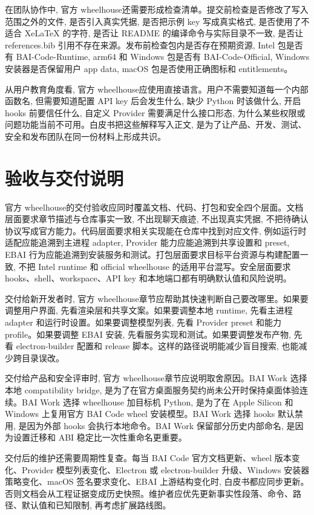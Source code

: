 在团队协作中, 官方 wheelhouse还需要形成检查清单。提交前检查是否修改了写入范围之外的文件, 是否引入真实凭据, 是否把示例 key 写成真实格式, 是否使用了不适合 XeLaTeX 的字符, 是否让 README 的编译命令与实际目录不一致, 是否让 references.bib 引用不存在来源。发布前检查包内是否存在预期资源, Intel 包是否有 BAI-Code-Runtime, arm64 和 Windows 包是否有 BAI-Code-Official, Windows 安装器是否保留用户 app data, macOS 包是否使用正确图标和 entitlements。

从用户教育角度看, 官方 wheelhouse应使用直接语言。用户不需要知道每一个内部函数名, 但需要知道配置 API key 后会发生什么, 缺少 Python 时该做什么, 开启 hooks 前要信任什么, 自定义 Provider 需要满足什么接口形态, 为什么某些权限或问题功能当前不可用。白皮书把这些解释写入正文, 是为了让产品、开发、测试、安全和发布团队在同一份材料上形成共识。

\section{验收与交付说明}
官方 wheelhouse的交付验收应同时覆盖文档、代码、打包和安全四个层面。文档层面要求章节描述与仓库事实一致, 不出现聊天痕迹, 不出现真实凭据, 不把待确认协议写成官方能力。代码层面要求相关实现能在仓库中找到对应文件, 例如运行时适配应能追溯到主进程 adapter, Provider 能力应能追溯到共享设置和 preset, EBAI 行为应能追溯到安装服务和测试。打包层面要求目标平台资源与构建配置一致, 不把 Intel runtime 和 official wheelhouse 的适用平台混写。安全层面要求 hooks、shell、workspace、API key 和本地端口都有明确默认值和风险说明。

交付给新开发者时, 官方 wheelhouse章节应帮助其快速判断自己要改哪里。如果要调整用户界面, 先看渲染层和共享文案。如果要调整本地 runtime, 先看主进程 adapter 和运行时设置。如果要调整模型列表, 先看 Provider preset 和能力 profile。如果要调整 EBAI 安装, 先看服务实现和测试。如果要调整发布产物, 先看 electron-builder 配置和 release 脚本。这样的路径说明能减少盲目搜索, 也能减少跨目录误改。

交付给产品和安全评审时, 官方 wheelhouse章节应说明取舍原因。BAI Work 选择本地 compatibility bridge, 是为了在官方桌面服务契约尚未公开时保持桌面体验连续。BAI Work 选择 wheelhouse 加目标机 Python, 是为了在 Apple Silicon 和 Windows 上复用官方 BAI Code wheel 安装模型。BAI Work 选择 hooks 默认禁用, 是因为外部 hooks 会执行本地命令。BAI Work 保留部分历史内部命名, 是因为设置迁移和 ABI 稳定比一次性重命名更重要。

交付后的维护还需要周期性复查。每当 BAI Code 官方文档更新、wheel 版本变化、Provider 模型列表变化、Electron 或 electron-builder 升级、Windows 安装器策略变化、macOS 签名要求变化、EBAI 上游结构变化时, 白皮书都应同步更新。否则文档会从工程证据变成历史快照。维护者应优先更新事实性段落、命令、路径、默认值和已知限制, 再考虑扩展路线图。

